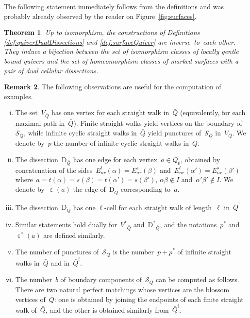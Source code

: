 \documentclass{amsart}
\newtheorem{theorem}{Theorem}[section]
\theoremstyle{definition}
\newtheorem{remark}[theorem]{Remark}
\newcommand{\fref}[1]{Figure~\ref{#1}} %
\newcommand{\Enrs}[1]{E_{nr}^{s}(#1)}
\newcommand{\Enrt}[1]{E_{nr}^{t}(#1)}
\newcommand{\surface}{\mathcal{S}} %
\newcommand{\dual}{^*} %
\newcommand{\dissection}{\mathrm{D}} %
\newcommand{\edgeof}{\operatorname{\varepsilon}} %
\newcommand{\dualedgeof}{\operatorname{\varepsilon}\dual} %
\newcommand{\koszul}{^!} %
\begin{document}
The following statement immediately follows from the definitions and was probably already observed by the reader on \fref{fig:surfaces}.

\begin{theorem}
\label{thm:bijectionLocallyGentleAndSurfaces}
Up to isomorphism, the constructions of Definitions \ref{def:quiverDualDissections} and \ref{def:surfaceQuiver} are inverse~to~each other.
They induce a bijection between the set of isomorphism classes of locally gentle bound quivers and the set of homeomorphism classes of marked surfaces with a pair of dual cellular dissections.
\end{theorem}

\begin{remark}
\label{rem:propertiesSurface}
The following observations are useful for the computation of examples.
\begin{enumerate}[(i)]
\item The set~$V_{\bar Q}$ has one vertex for each straight walk in~$\bar Q$ (equivalently, for each maximal path in~$\bar Q$).
      Finite straight walks yield vertices on the boundary of~$\surface_{\bar Q}$, while infinite cyclic straight walks in~$\bar Q$ yield punctures of~$\surface_{\bar Q}$ in~$V_{\bar Q}$.
      We denote by~$p$ the number of infinite cyclic straight walks in~$\bar Q$.
\item \label{item:edges}
      The dissection~$\dissection_{\bar Q}$ has one edge for each vertex~$a \in \bar Q_0$, obtained by concatenation of the sides~$\Enrt{\alpha} = \Enrs{\beta}$ and~$\Enrt{\alpha'} = \Enrs{\beta'}$ where~$a = t(\alpha) = s(\beta) = t(\alpha') = s(\beta')$, $\alpha\beta \notin I$ and~$\alpha'\beta' \notin I$. We denote by~$\edgeof(a)$ the edge of~$\dissection_{\bar Q}$ corresponding to~$a$.
\item The dissection~$\dissection_{\bar Q}$ has one $\ell$-cell for each straight walk of length~$\ell$ in~$\bar Q\koszul$.
\item Similar statements hold dually for~${{V\dual}\!\!_{\bar Q}}$ and~${\dissection\dual\!\!_{\bar Q}}$, and the notations~$p\dual$ and~$\dualedgeof(a)$ are defined similarly.
\item The number of punctures of~$\surface_{\bar Q}$ is the number~$p + p\dual$ of infinite straight walks in~$\bar Q$ and in~$\bar Q\koszul$.
\item \label{item:boundary}
      The number~$b$ of boundary components of~$\surface_{\bar Q}$ can be computed as follows.
      There are two natural perfect matchings whose vertices are the blossom vertices of~$\bar Q$: one is obtained by joining the endpoints of each finite straight walk of~$\bar Q$, and the other is obtained similarly from~$\bar Q \koszul$.

\end{enumerate}
\end{remark}
\end{document}
